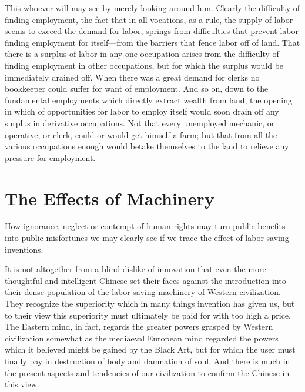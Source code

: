 \documentclass{book}
\begin{document}
This whoever will may see by merely looking around him. Clearly the difficulty of finding employment, the fact that in all vocations, as a rule, the supply of labor seems to exceed the demand for labor, springs from difficulties that prevent labor finding employment for itself—from the barriers that fence labor off of land. That there is a surplus of labor in any one occupation arises from the difficulty of finding employment in other occupations, but for which the surplus would be immediately drained off. When there was a great demand for clerks no bookkeeper could suffer for want of employment. And so on, down to the fundamental employments which directly extract wealth from land, the opening in which of opportunities for labor to employ itself would soon drain off any surplus in derivative occupations. Not that every unemployed mechanic, or operative, or clerk, could or would get himself a farm; but that from all the various occupations enough would betake themselves to the land to relieve any pressure for employment.

\chapter{The Effects of Machinery}
\label{chapter-14}
How ignorance, neglect or contempt of human rights may turn public benefits into public misfortunes we may clearly see if we trace the effect of labor-saving inventions.

It is not altogether from a blind dislike of innovation that even the more thoughtful and intelligent Chinese set their faces against the introduction into their dense population of the labor-saving machinery of Western civilization. They recognize the superiority which in many things invention has given us, but to their view this superiority must ultimately be paid for with too high a price. The Eastern mind, in fact, regards the greater powers grasped by Western civilization somewhat as the mediaeval European mind regarded the powers which it believed might be gained by the Black Art, but for which the user must finally pay in destruction of body and damnation of soul. And there is much in the present aspects and tendencies of our civilization to confirm the Chinese in this view.
\end{document}
